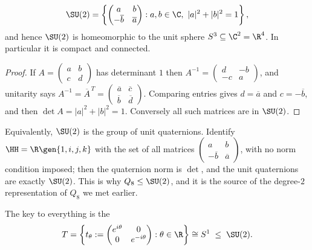 \begin{proposition}
	$$\SU(2) = \left\{\begin{pmatrix}a & b\\ -\overline b & \overline a\end{pmatrix} : a,b\in\C,\ |a|^2+|b|^2 = 1\right\},$$
	and hence $\SU(2)$ is homeomorphic to the unit sphere $S^3\subseteq\C^2 = \R^4$. In particular it is compact and connected.
\end{proposition}
\begin{proof}
	If $A = \left(\begin{smallmatrix}a&b\\c&d\end{smallmatrix}\right)$ has determinant $1$ then $A^{-1} = \left(\begin{smallmatrix}d&-b\\-c&a\end{smallmatrix}\right)$, and unitarity says $A^{-1} = \overline A^{\,T} = \left(\begin{smallmatrix}\overline a&\overline c\\ \overline b&\overline d\end{smallmatrix}\right)$. Comparing entries gives $d = \overline a$ and $c = -\overline b$, and then $\det A = |a|^2+|b|^2 = 1$. Conversely all such matrices are in $\SU(2)$.
\end{proof}

\begin{remark}
	Equivalently, $\SU(2)$ is the group of unit quaternions. Identify $\HH = \R\gen{1,i,j,k}$ with the set of all matrices $\left(\begin{smallmatrix}a&b\\-\overline b&\overline a\end{smallmatrix}\right)$, with no norm condition imposed; then the quaternion norm is $\det$, and the unit quaternions are exactly $\SU(2)$. This is why $Q_8\leq\SU(2)$, and it is the source of the degree-$2$ representation of $Q_8$ we met earlier.
\end{remark}

The key to everything is the 
$$T = \left\{ t_\theta := \begin{pmatrix}e^{i\theta}&0\\0&e^{-i\theta}\end{pmatrix} : \theta\in\R\right\} \cong S^1 \; \leq \; \SU(2).$$

